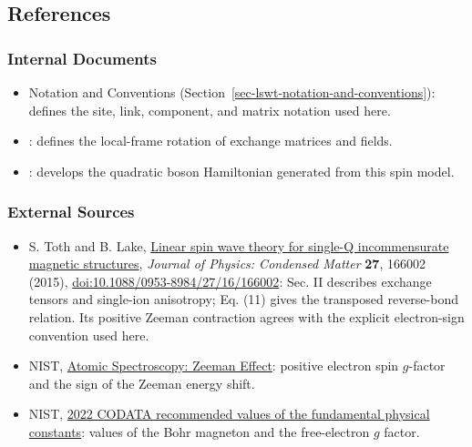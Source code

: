 \subsection{References}

\subsubsection{Internal Documents}

\begin{itemize}
\tightlist
\item
  Notation and Conventions (Section~\ref{sec-lswt-notation-and-conventions}): defines the site, link, component, and matrix notation used here.
\item
  : defines the local-frame rotation of exchange matrices and fields.
\item
  : develops the quadratic boson Hamiltonian generated from this spin model.
\end{itemize}

\subsubsection{External Sources}

\begin{itemize}
\tightlist
\item
  S. Toth and B. Lake, \href{https://arxiv.org/abs/1402.6069}{Linear spin wave theory for single-Q incommensurate magnetic structures}, \emph{Journal of Physics: Condensed Matter} \textbf{27}, 166002 (2015), \href{https://doi.org/10.1088/0953-8984/27/16/166002}{doi:10.1088/0953-8984/27/16/166002}: Sec. II describes exchange tensors and single-ion anisotropy; Eq. (11) gives the transposed reverse-bond relation. Its positive Zeeman contraction agrees with the explicit electron-sign convention used here.
\item
  NIST, \href{https://www.nist.gov/pml/atomic-spectroscopy-compendium-basic-ideas-notation-data-and-formulas/atomic-spectroscopy-zeeman}{Atomic Spectroscopy: Zeeman Effect}: positive electron spin \(g\)-factor and the sign of the Zeeman energy shift.
\item
  NIST, \href{https://physics.nist.gov/cuu/Constants/Table/allascii.txt}{2022 CODATA recommended values of the fundamental physical constants}: values of the Bohr magneton and the free-electron \(g\) factor.
\end{itemize}
